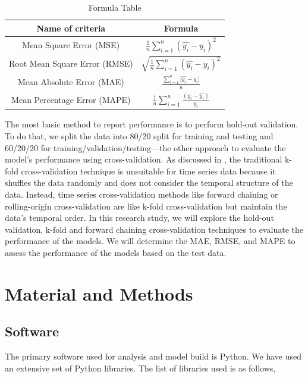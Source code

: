 \documentclass[mstat,12pt]{unswthesis}
\begin{document}
\begin{table}[h]
\centering
\caption{Formula Table}
\begin{tabular}{|c|c|}
\hline
\textbf{Name of criteria} & \textbf{Formula} \\ 
\hline
Mean Square Error (MSE) & ${\frac{1}{n}\sum_{i=1}^{n}(\hat{y_i} - y_i)^2}$ \\ 
\hline
Root Mean Square Error (RMSE) & $\sqrt{\frac{1}{n}\sum_{i=1}^{n}(\hat{y_i} - y_i)^2}$ \\ 
\hline
Mean Absolute Error (MAE) & $\frac{\sum_{i=1}^n|\hat{y_i}-y_i|}{n}$ \\ 
\hline
Mean Percentage Error (MAPE) & $\frac{1}{n}\sum_{i=1}^{n}\frac{(y_i-\hat{y_i})}{y_i}$ \\ 
\hline
\end{tabular}
\end{table}

The most basic method to report performance is to perform hold-out
validation. To do that, we split the data into 80/20 split for training
and testing and 60/20/20 for training/validation/testing---the other
approach to evaluate the model's performance using cross-validation. As
discussed in \cite{rafferty2023forecasting}, the traditional k-fold
cross-validation technique is unsuitable for time series data because it
shuffles the data randomly and does not consider the temporal structure
of the data. Instead, time series cross-validation methods like forward
chaining or rolling-origin cross-validation are like k-fold
cross-validation but maintain the data's temporal order. In this
research study, we will explore the hold-out validation, k-fold and
forward chaining cross-validation techniques to evaluate the performance
of the models. We will determine the MAE, RMSE, and MAPE to assess the
performance of the models based on the test data.

\chapter{Material and Methods}\label{material-and-methods}

\section{Software}\label{software}

The primary software used for analysis and model build is Python. We
have used an extensive set of Python libraries. The list of libraries
used is as follows,
\end{document}
